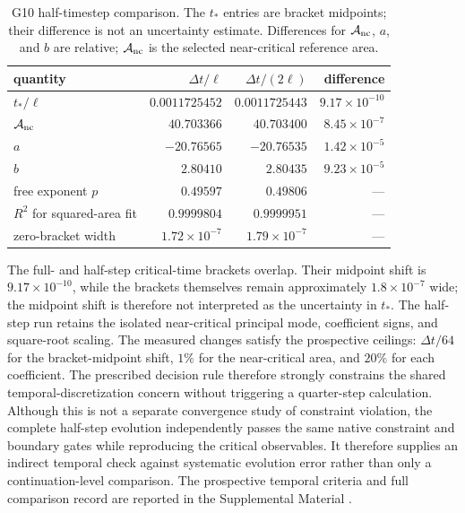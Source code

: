\documentclass[11pt]{article}
\begin{document}
\begin{table}[t]
\centering
\caption{G10 half-timestep comparison.  The $t_*$ entries are bracket
midpoints; their difference is not an uncertainty estimate.  Differences for
$\mathcal A_{\rm nc}$, $a$, and $b$ are relative; $\mathcal A_{\rm nc}$ is the
selected near-critical reference area.}
\label{tab:temporal-closure}
\begin{tabular}{@{}lrrr@{}}
\toprule
quantity & $\Delta t/\ell$ & $\Delta t/(2\ell)$ & difference \\
\midrule
$t_*/\ell$ & $0.0011725452$ & $0.0011725443$ & $9.17\times10^{-10}$ \\
$\mathcal A_{\rm nc}$ & $40.703366$ & $40.703400$ & $8.45\times10^{-7}$ \\
$a$ & $-20.76565$ & $-20.76535$ & $1.42\times10^{-5}$ \\
$b$ & $2.80410$ & $2.80435$ & $9.23\times10^{-5}$ \\
free exponent $p$ & $0.49597$ & $0.49806$ & --- \\
$R^2$ for squared-area fit & $0.9999804$ & $0.9999951$ & --- \\
zero-bracket width & $1.72\times10^{-7}$ & $1.79\times10^{-7}$ & --- \\
\bottomrule
\end{tabular}
\end{table}

The full- and half-step critical-time brackets overlap.  Their midpoint shift
is $9.17\times10^{-10}$, while the brackets themselves remain approximately
$1.8\times10^{-7}$ wide; the midpoint shift is therefore not interpreted as
the uncertainty in $t_*$.  The half-step run retains the isolated
near-critical principal mode, coefficient signs, and
square-root scaling.  The measured changes satisfy the prospective ceilings:
$\Delta t/64$ for the bracket-midpoint shift, $1\%$ for the near-critical
area, and $20\%$ for each coefficient.  The prescribed decision rule therefore
strongly constrains the shared temporal-discretization concern without
triggering a quarter-step calculation.
Although this is not a separate convergence study of constraint violation,
the complete half-step evolution independently passes the same native
constraint and boundary gates while reproducing the critical observables.
It therefore supplies an indirect temporal check against systematic evolution
error rather than only a continuation-level comparison.
The prospective temporal criteria and full comparison record are reported in
the Supplemental Material \cite{SupplementalMaterial}.
\end{document}
